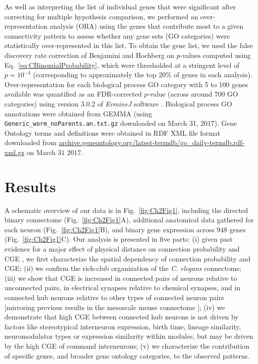 As well as interpreting the list of individual genes that were significant after correcting for multiple hypothesis comparison, we performed an over-representation analysis (ORA) using the genes that contribute most to a given connectivity pattern to assess whether any gene sets (GO categories) were statistically over-represented in this list.
To obtain the gene list, we used the false discovery rate correction of Benjamini and Hochberg \citep{Benjamini1995} on $p$-values computed using Eq.~\eqref{eq:CBinomialProbability}, which were thresholded at a stringent level of $p = 10^{-4}$ (corresponding to approximately the top 20\% of genes in each analysis).
Over-representation for each biological process GO category with 5 to 100 genes available was quantified as an FDR-corrected $p$-value (across around 700 GO categories) using version 3.0.2 of \emph{ErmineJ} software \citep{Gillis2010}.
Biological process GO annotations \citep{Ashburner2000} were obtained from GEMMA \citep{Zoubarev2012} (using \texttt{Generic\_worm\_noParents.an.txt.gz} downloaded on March 31, 2017).
Gene Ontology terms and definitions were obtained in RDF XML file format downloaded from \url{archive.geneontology.org/latest-termdb/go_daily-termdb.rdf-xml.gz} on March $31$ $2017$.

\section{Results}

A schematic overview of our data is in Fig.~\ref{fig:Ch2Fig1}, including
the directed binary connectome (Fig.~\ref{fig:Ch2Fig1}A),
additional anatomical data gathered for each neuron (Fig.~\ref{fig:Ch2Fig1}B),
and binary gene expression across $948$ genes (Fig.~\ref{fig:Ch2Fig1}C).
Our analysis is presented in five parts:
(i) given past evidence for a major effect of physical distance on connection probability and CGE  \citep{Fulcher2016}, we first characterize the spatial dependency of connection probability and CGE;
(ii) we confirm the rich-club organization of the \emph{C. elegans} connectome;
(iii) we show that CGE is increased in connected pairs of neurons relative to unconnected pairs, in electrical synapses relative to chemical synapses, and in connected hub neurons relative to other types of connected neuron pairs [mirroring previous results in the mesoscale mouse connectome \citep{Fulcher2016}];
(iv) we demonstrate that high CGE between connected hub neurons is not driven by factors like stereotypical interneuron expression, birth time, lineage similarity, neuromodulator types or expression similarity within modules, but may be driven by the high CGE of command interneurons;
(v) we characterize the contribution of specific genes, and broader gene ontology categories, to the observed patterns.

